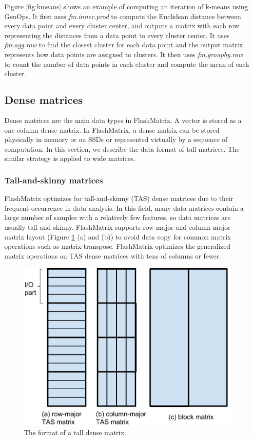 Figure \ref{fig:kmeans} shows an example of computing an iteration of k-means
\cite{kmeans} using GenOps. It first uses \textit{fm.inner.prod} to
compute the Euclidean distance between every data point and every cluster center,
and outputs a matrix with each row representing the distances from a data
point to every cluster center. It uses \textit{fm.agg.row} to find the closest
cluster for each data point and the output matrix represents how data points
are assigned to clusters. It then uses \textit{fm.groupby.row} to count
the number of data points in each cluster and compute the mean of each cluster.

\subsection{Dense matrices}
Dense matrices are the main data types in FlashMatrix. A vector is stored
as a one-column dense matrix. In FlashMatrix, a dense matrix can be stored
physically in memory or on SSDs or represented virtually by a sequence of
computation. In this section, we describe the data format of tall matrices.
The similar strategy is applied to wide matrices.

\subsubsection{Tall-and-skinny matrices} \label{sec:tas_mat}

FlashMatrix optimizes for tall-and-skinny (TAS) dense matrices due to their
frequent occurrence in data analysis. In this field, many data matrices contain
a large number of samples with a relatively few features, so data matrices
are usually tall and skinny. FlashMatrix supports row-major and column-major
matrix layout (Figure \ref{fig:den_mat} (a) and (b)) to avoid data copy for
common matrix operations such as matrix transpose. FlashMatrix optimizes
the generalized matrix operations on TAS dense matrices with tens of columns
or fewer.

\begin{figure}
	\centering
	\includegraphics[scale=0.5]{FlashMatrix_figs/dense_matrix2.pdf}
	\caption{The format of a tall dense matrix.}
	\label{fig:den_mat}
\end{figure}


